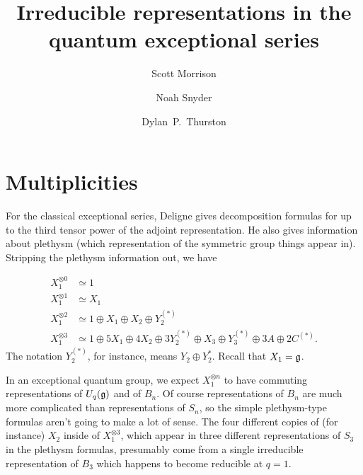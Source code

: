 \documentclass[12pt]{amsart}
\begin{document}
\title{Irreducible representations in the quantum exceptional series}

\author[Morrison]{Scott Morrison}
\address{Mathematical Sciences Institute, Australian National University}

\author[Snyder]{Noah Snyder}
\address{Bloomington, Indiana, USA}

\author[Thurston]{Dylan~P.~Thurston}
\address{Bloomington, Indiana, USA}

\maketitle

\section{Multiplicities}
\label{sec:multiplicities}

For the classical exceptional series, Deligne \cite{MR1378507} gives
decomposition formulas for up to the third tensor power of the adjoint
representation. He also gives information about plethysm (which
representation of the symmetric group things appear in). Stripping
the plethysm information out, we have

\begin{align*}
  X_1^{\otimes 0} &\simeq 1\\
  X_1^{\otimes 1} &\simeq X_1\\
  X_1^{\otimes 2} &\simeq 1 \oplus X_1 \oplus X_2 \oplus Y_2^{(*)}\\
  X_1^{\otimes 3} &\simeq 1 \oplus 5X_1 \oplus 4X_2 \oplus 3Y_2^{(*)} \oplus X_3
                    \oplus Y_3^{(*)} \oplus 3A \oplus 2C^{(*)}.
\end{align*}
The notation $Y_2^{(*)}$, for instance, means $Y_2 \oplus
Y_2^*$. Recall that $X_1 = {\mathfrak g}$.

In an exceptional quantum group, we expect $X_1^{\otimes n}$ to have
commuting representations of $U_q({\mathfrak g})$ and of $B_n$. Of course
representations of $B_n$ are much more complicated than
representations of $S_n$, so the simple plethysm-type formulas aren't
going to make a lot of sense. The four different copies of (for instance)
$X_2$ inside of $X_1^{\otimes 3}$, which appear in three different
representations of $S_3$ in the plethysm formulas, presumably come
from a single irreducible representation of $B_3$ which happens to
become reducible at $q=1$.
\end{document}

